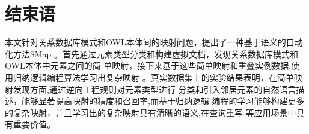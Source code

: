 \chapter{结束语}
\label{chap06}

本文针对关系数据库模式和OWL本体间的映射问题，提出了一种基于语义的自动化方法SMap
。首先通过元素类型分类和构建虚拟文档，发现关系数据库模式和OWL本体中元素之间的简
单映射，接下来基于这些简单映射和重叠实例数据,使用归纳逻辑编程算法学习出复杂映射
。真实数据集上的实验结果表明，在简单映射发现方面,通过逆向工程规则对元素类型进行
分类和引入邻居元素的自然语言描述，能够显著提高映射的精度和召回率,而基于归纳逻辑
编程的学习能够构建更多的复杂映射，并且学习出的复杂映射具有清晰的语义,在查询重写
等应用场景中具有重要价值。

